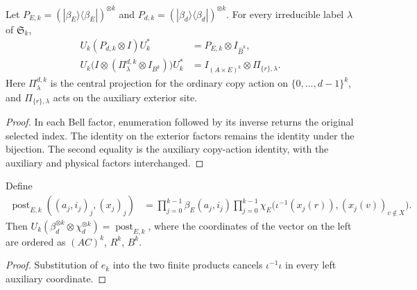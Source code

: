 \begin{theorem}
    \label{thm:schmidt_bell_site_projections}
    \leanok
    Let $P_{E,k}=(|\beta_E\rangle\langle\beta_E|)^{\otimes k}$ and
    $P_{d,k}=(|\beta_d\rangle\langle\beta_d|)^{\otimes k}$.
    For every irreducible label $\lambda$ of $\mathfrak S_k$,
    \begin{align*}
        U_k(P_{d,k}\otimes I)U_k^*&=P_{E,k}\otimes I_{\widehat B^k},\\
        U_k\bigl(I\otimes(\Pi^{d,k}_\lambda\otimes I_{B^k})\bigr)U_k^*
        &=I_{(A\times E)^k}\otimes\Pi_{\{r\},\lambda}.
    \end{align*}
    Here $\Pi^{d,k}_\lambda$ is the central projection for the ordinary copy
    action on $\{0,\ldots,d-1\}^k$, and $\Pi_{\{r\},\lambda}$ acts on the
    auxiliary exterior site.
\end{theorem}
\begin{proof}
    \leanok
    In each Bell factor, enumeration followed by its inverse returns the
    original selected index. The identity on the exterior factors remains
    the identity under the bijection. The second equality is the auxiliary
    copy-action identity, with the auxiliary and physical factors interchanged.
\end{proof}

\begin{theorem}
    \label{thm:schmidt_bell_site_post}
    \leanok
    Define
    \begin{align*}
        \operatorname{post}_{E,k}((a_j,i_j)_j,(x_j)_j)
        &=\prod_{j=0}^{k-1}\beta_E(a_j,i_j)
        \prod_{j=0}^{k-1}\chi_E\bigl(\iota^{-1}(x_j(r)),
        (x_j(v))_{v\notin X}\bigr).
    \end{align*}
    Then $U_k(\beta_d^{\otimes k}\otimes\chi_d^{\otimes k})
    =\operatorname{post}_{E,k}$, where the coordinates of the vector on the
    left are ordered as $(AC)^k$, $R^k$, $B^k$.
\end{theorem}
\begin{proof}
    \leanok
    Substitution of $e_k$ into the two finite products cancels
    $\iota^{-1}\iota$ in every left auxiliary coordinate.
\end{proof}

